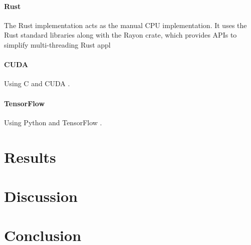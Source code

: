 \documentclass[12pt]{article}
\newcommand{\CC}{C\nolinebreak\hspace{-.05em}\raisebox{.4ex}{\tiny\bf +}\nolinebreak\hspace{-.10em}\raisebox{.4ex}{\tiny\bf +}}
\begin{document}
\paragraph{Rust}
The Rust \cite{lang_rust} implementation acts as the manual CPU implementation.
It uses the Rust standard libraries along with the Rayon crate, which provides APIs to simplify multi-threading Rust appl


\paragraph{CUDA}
Using \CC  \cite{lang_c++} and CUDA \cite{lib_cuda}.

\paragraph{TensorFlow}
Using Python \cite{lang_python} and TensorFlow \cite{lib_tensorflow}.

\section{Results}

\section{Discussion}


\section{Conclusion}

\newpage


\end{document}

